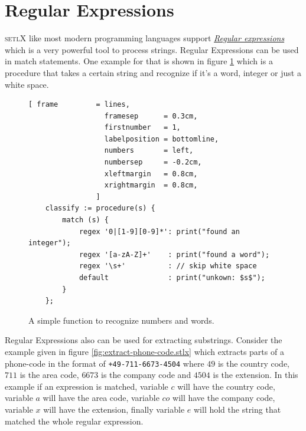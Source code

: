 \documentclass[11pt]{report}
\begin{document}
\section{Regular Expressions}
\textsc{setlX} like most modern programming languages support \href{http://en.wikipedia.org/wiki/Regular_expression}{\emph{Regular expressions}} which is a very powerful tool to process strings. Regular Expressions can be used in match statements. One example for that is shown in figure \ref{fig:regexp.stlx} which is a procedure that takes a certain string and recognize if it's a word, integer or just a white space.

\begin{figure}[!ht]
\centering
\begin{Verbatim}[ frame         = lines, 
                  framesep      = 0.3cm, 
                  firstnumber   = 1,
                  labelposition = bottomline,
                  numbers       = left,
                  numbersep     = -0.2cm,
                  xleftmargin   = 0.8cm,
                  xrightmargin  = 0.8cm,
                ]
    classify := procedure(s) {
        match (s) {
            regex '0|[1-9][0-9]*': print("found an integer");
            regex '[a-zA-Z]+'    : print("found a word");
            regex '\s+'          : // skip white space
            default              : print("unkown: $s$");
        }
    };
\end{Verbatim}
\vspace*{-0.3cm}
\caption{A simple function to recognize numbers and words.}
\label{fig:regexp.stlx}
\end{figure} 
Regular Expressions also can be used for extracting substrings. Consider the example given in figure \ref{fig:extract-phone-code.stlx} which extracts parts of a phone-code in the format of \texttt{+49-711-6673-4504} where $49$ is the country code, $711$ is the area code, $6673$ is the company code and $4504$ is the extension. In this example if an expression is matched, variable $c$ will have the country code, variable $a$ will have the area code, variable $co$ will have the company code, variable $x$ will have the extension, finally variable $e$ will hold the string that matched the whole regular expression.
\end{document}
